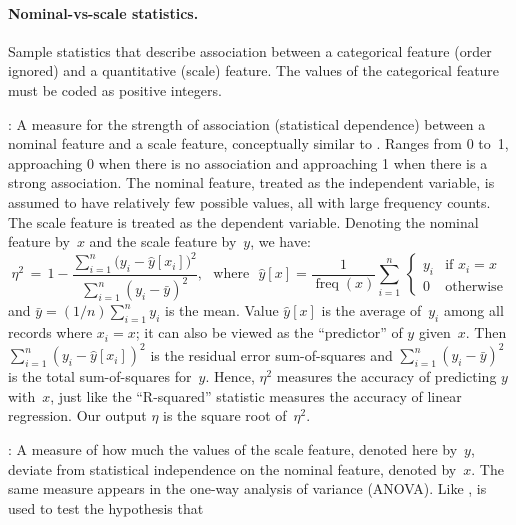 \paragraph{Nominal-vs-scale statistics.}
Sample statistics that describe association between a categorical feature
(order ignored) and a quantitative (scale) feature.
The values of the categorical feature must be coded as positive integers.
\begin{Description}
\item[\it\NameStatEta]:
A measure for the strength of association (statistical dependence) between a nominal feature
and a scale feature, conceptually similar to \NameStatR.  Ranges from 0 to~1, approaching 0
when there is no association and approaching 1 when there is a strong association.  
The nominal feature, treated as the independent variable, is assumed to have relatively few
possible values, all with large frequency counts.  The scale feature is treated as the dependent
variable.  Denoting the nominal feature by~$x$ and the scale feature by~$y$, we have:
\begin{equation*}
\eta^2 \,=\, 1 - \frac{\sum_{i=1}^{n} \big(y_i - \hat{y}[x_i]\big)^2}{\sum_{i=1}^{n} (y_i - \bar{y})^2},
\,\,\,\,\textrm{where}\,\,\,\,
\hat{y}[x] = \frac{1}{\mathop{\mathrm{freq}}(x)}\sum_{i=1}^n  
\,\left\{\!\!\begin{array}{rl} y_i & \textrm{if $x_i = x$}\\ 0 & \textrm{otherwise}\end{array}\right.\!\!\!
\end{equation*}
and $\bar{y} = (1{/}n)\sum_{i=1}^n y_i$ is the mean.  Value $\hat{y}[x]$ is the average 
of~$y_i$ among all records where $x_i = x$; it can also be viewed as the ``predictor'' 
of $y$ given~$x$.  Then $\sum_{i=1}^{n} (y_i - \hat{y}[x_i])^2$ is the residual error
sum-of-squares and $\sum_{i=1}^{n} (y_i - \bar{y})^2$ is the total sum-of-squares for~$y$. 
Hence, $\eta^2$ measures the accuracy of predicting $y$ with~$x$, just like the
``R-squared'' statistic measures the accuracy of linear regression.  Our output $\eta$
is the square root of~$\eta^2$.
\item[\it\NameStatF]:
A measure of how much the values of the scale feature, denoted here by~$y$,
deviate from statistical independence on the nominal feature, denoted by~$x$.
The same measure appears in the one-way analysis of vari\-ance (ANOVA).
Like \NameStatChi, \NameStatF{} is used to test the hypothesis that

\end{Description}
